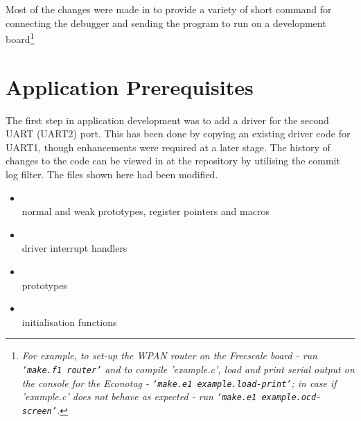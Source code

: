  Most of the changes were made in 
 to provide a variety of short command for connecting the debugger
 and sending the program to run on a development board\footnote{
 \emph{For example, to set-up the WPAN router on the Freescale board - run
 \texttt{`make.f1 router'} and to compile 'example.c', load and print
 serial output on the console for the Econotag  -
 \texttt{`make.e1 example.load-print'}; in case if 'example.c' does
 not behave as expected - run \texttt{`make.e1 example.ocd-screen'}.}}
 
\section{Application Prerequisites}

  The first step in application development was to add a driver for
 the second UART (UART2) port. This has been done by copying an
 existing driver code for UART1, though enhancements were required
 at a later stage. The history of changes to the code can be viewed
 in at the repository by utilising the commit log filter. The files
 shown here had been modified.

 \begin{itemize}
 \item {} \\
 	normal and weak prototypes, register pointers and macros
 \item {} \\
 	driver interrupt handlers
 \item {} \\
	prototypes
 \item {} \\
	initialisation functions
 \end{itemize}

